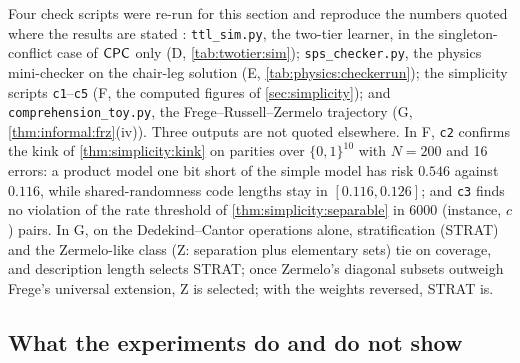 Four check scripts were re-run for this section and reproduce the numbers quoted where the results are stated : \texttt{ttl\_sim.py}, the two-tier learner, in the singleton-conflict case of $\mathsf{CPC}$ only (D, \cref{tab:twotier:sim}); \texttt{sps\_checker.py}, the physics mini-checker on the chair-leg solution (E, \cref{tab:physics:checkerrun}); the simplicity scripts \texttt{c1}--\texttt{c5} (F, the \textsf{computed} figures of \cref{sec:simplicity}); and \texttt{comprehension\_toy.py}, the Frege--Russell--Zermelo trajectory (G, \cref{thm:informal:frz}(iv)). Three outputs are not quoted elsewhere. In F, \texttt{c2} confirms the kink of \cref{thm:simplicity:kink} on parities over $\{0,1\}^{10}$ with $N=200$ and 16 errors: a product model one bit short of the simple model has risk $0.546$ against $0.116$, while shared-randomness code lengths stay in $[0.116,0.126]$; and \texttt{c3} finds no violation of the rate threshold of \cref{thm:simplicity:separable} in 6000 (instance, $c$) pairs. In G, on the Dedekind--Cantor operations alone, stratification (STRAT) and the Zermelo-like class (Z: separation plus elementary sets) tie on coverage, and description length selects STRAT; once Zermelo's diagonal subsets outweigh Frege's universal extension, Z is selected; with the weights reversed, STRAT is.

\subsection{What the experiments do and do not show}\label{sec:experiments:limits}

